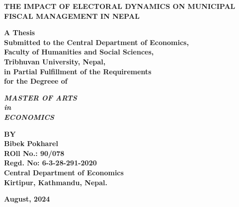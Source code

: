 \begin{titlepage}
   \begin{center}
        \vspace*{-1cm}
        \begin{center}
        \textbf{THE IMPACT OF ELECTORAL DYNAMICS ON MUNICIPAL\\ FISCAL MANAGEMENT IN NEPAL}
    	\end{center}
        \vspace{3.5cm}
        
        \textbf{\large {A Thesis}} \\
        
        \textbf{Submitted to the 
        Central Department of Economics, \\
        Faculty of Humanities and Social Sciences, \\
        Tribhuvan University, Nepal,\\
        in Partial Fulfillment of the Requirements\\
        for the Degreee of}
        
        \vspace{3.5cm}
        
    
        \textbf{\emph{MASTER OF ARTS} \\
        \emph{in} \\
        \emph{ECONOMICS}}        
        \vspace{3.5cm}
        
        \textbf{BY \\
        Bibek Pokharel \\
        ROll No.: 90/078 \\
        Regd. No: 6-3-28-291-2020}   \\     
        \textbf{Central Department of Economics \\
        Kirtipur, Kathmandu, Nepal.}
        
        \vspace{2.5cm}
        
        \textbf{August, 2024}
        
    \end{center}
\end{titlepage}


\renewcommand{\contentsname}{Table of Contents} %






\newpage

